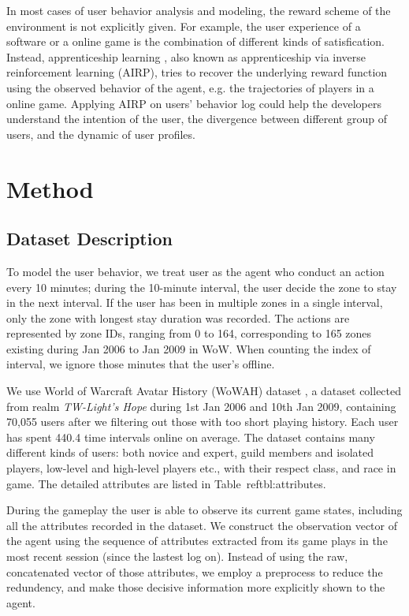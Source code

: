 \documentclass{sigchi}
\begin{document}
In most cases of user behavior analysis and modeling, the reward scheme of the environment is not explicitly given. For example, the user experience of a software or a online game is the combination of different kinds of satisfication. Instead, apprenticeship learning \cite{ratliff2006maximum,abbeel2004apprenticeship,ng2000algorithms}, also known as apprenticeship via inverse reinforcement learning (AIRP), tries to recover the underlying reward function using the observed behavior of the agent, e.g. the trajectories of players in a online game. Applying AIRP on users' behavior log could help the developers understand the intention of the user, the divergence between different group of users, and the dynamic of user profiles. 

\section{Method}

\subsection{Dataset Description}

To model the user behavior, we treat user as the agent who conduct an action every 10 minutes; during the 10-minute interval, the user decide the zone to stay in the next interval. If the user has been in multiple zones in a single interval, only the zone with longest stay duration was recorded. The actions are represented by zone IDs, ranging from 0 to 164, corresponding to 165 zones existing during Jan 2006 to Jan 2009 in WoW. When counting the index of interval, we ignore those minutes that the user's offline.

We use World of Warcraft Avatar History (WoWAH) dataset \cite{lee2011world}, a dataset collected from realm \textit{TW-Light's Hope} during 1st Jan 2006 and 10th Jan 2009, containing 70,055 users after we filtering out those with too short playing history. Each user has spent 440.4 time intervals online on average. The dataset contains many different kinds of users: both novice and expert, guild members and isolated players, low-level and high-level players etc., with their respect class, and race in game. The detailed attributes are listed in Table~ref{tbl:attributes}.

During the gameplay the user is able to observe its current game states, including all the attributes recorded in the dataset. We construct the observation vector of the agent using the sequence of attributes extracted from its game plays in the most recent session (since the lastest log on). Instead of using the raw, concatenated vector of those attributes, we employ a preprocess to reduce the redundency, and make those decisive information more explicitly shown to the agent.
\end{document}
